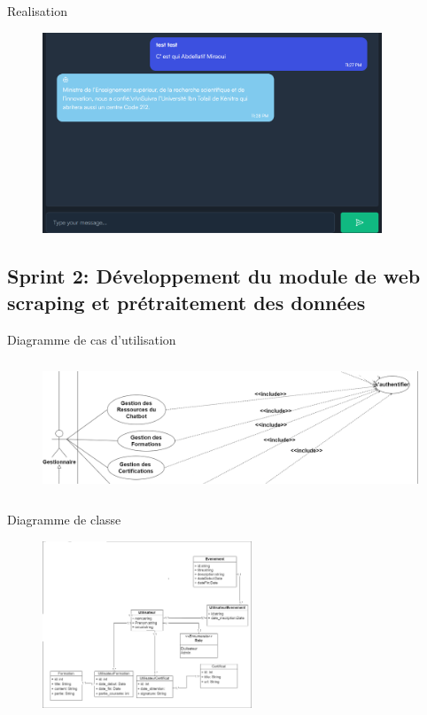 \begin{frame}{Realisation}
    \begin{figure}[H]
        \centering
        \includegraphics[height=6cm]{assets/images/chat2.png}
    \end{figure}
\end{frame}


\subsection{Sprint 2: Développement du module de web scraping et prétraitement des données}
\begin{frame}{Diagramme de cas d'utilisation}

    \begin{figure}[H]
        \centering
        \includegraphics[height=4cm]{assets/images/sprint2-usecase.png}
    \end{figure}
\end{frame}

\begin{frame}{Diagramme de classe}

    \begin{figure}[H]
        \centering
        \includegraphics[height=5cm]{assets/images/sprint2-class.png}
    \end{figure}
\end{frame}


